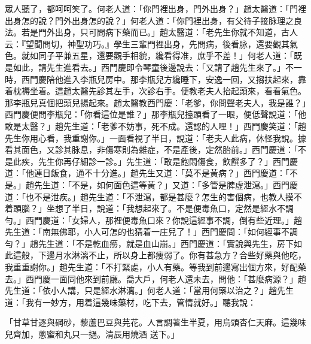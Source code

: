 眾人聽了，都呵呵笑了。何老人道：「你門裡出身，門外出身？」趙太醫道：「門裡出身怎的說？門外出身怎的說？」何老人道：「你門裡出身，有父待子接脉理之良法。若是門外出身，只可問病下藥而已。」趙太醫道：「老先生你就不知道，古人云：『望聞問切，神聖功巧。』學生三輩門裡出身，先問病，後看脉，還要觀其氣色。就如同子平兼五星，還要觀手相貌，纔看得准，庶乎不差！」何老人道：「既是如此，請先生進看去。」西門慶即令琴童後邊說去：「又請了趙先生來了。」不一時，西門慶陪他進入李瓶兒房中。那李瓶兒方纔睡下，安逸一回，又搊扶起來，靠着枕褥坐着。這趙太醫先診其左手，次診右手。便教老夫人抬起頭來，看看氣色。那李瓶兒真個把頭兒揚起來。趙太醫教西門慶：「老爹，你問聲老夫人，我是誰？」西門慶便問李瓶兒：「你看這位是誰？」那李瓶兒擡頭看了一眼，便低聲說道：「他敢是太醫？」趙先生道：「老爹不妨事，死不成。還認的人哩！」西門慶笑道：「趙先生你用心看，我重謝你。」一面看視了半日，說道：「老夫人此病，休怪我說。據看其面色，又診其脉息，非傷寒則為雜症，不是產後，定然胎前。」西門慶道：「不是此疾，先生你再仔細診一診。」先生道：「敢是飽悶傷食，飲饌多了？」西門慶道：「他連日飯食，通不十分進。」趙先生又道：「莫不是黃病？」西門慶道：「不是。」趙先生道：「不是，如何面色這等黃？」又道：「多管是脾虛泄瀉。」西門慶道：「也不是泄疾。」趙先生道：「不泄瀉，都是甚麼？怎生的害個病，也教人摸不着頭腦？」坐想了半日，說道：「我想起來了。不是便毒魚口，定然是經水不調勻。」西門慶道：「女婦人，那裡便毒魚口來？你說這經事不調，倒有些近理。」趙先生道：「南無佛耶，小人可怎的也猜着一庄兒了！」西門慶問：「如何經事不調勻？」趙先生道：「不是乾血癆，就是血山崩。」西門慶道：「實說與先生，房下如此這般，下邊月水淋漓不止，所以身上都瘦弱了。你有甚急方？合些好藥與他吃，我重重謝你。」趙先生道：「不打緊處，小人有藥。等我到前邊寫出個方來，好配藥去。」西門慶一面同他來到前廳。喬大戶，何老人還未去，問他：「甚麼病源？」趙先生道：「依小人講，只是經水淋漓。」何老人道：「當用何藥以治之？」趙先生道：「我有一妙方，用着這幾味藥材，吃下去，管情就好。」聽我說：

「甘草甘逐與碙砂，藜蘆巴豆與芫花。人言調著生半夏，用烏頭杏仁天麻。這幾味兒齊加，蔥蜜和丸只一撾。清辰用燒酒 送下。」

